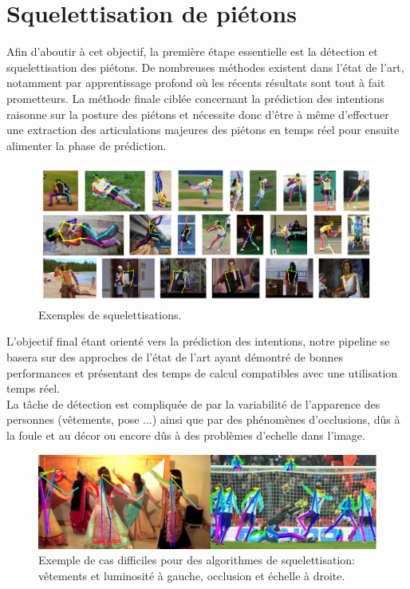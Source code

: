 \section{Squelettisation de piétons}

Afin d’aboutir à cet objectif, la première étape essentielle est la détection et squelettisation des piétons. De nombreuses méthodes existent dans l’état de l’art, notamment par apprentissage profond où les récents résultats sont tout à fait prometteurs. La méthode finale ciblée concernant la prédiction des intentions raisonne sur la posture des piétons et nécessite donc d’être à même d’effectuer une extraction des articulations majeures des piétons en temps réel pour ensuite alimenter la phase de prédiction.


\begin{figure}[H]
    \centering
    \includegraphics[width=0.9\linewidth]{Images/pose_estim_example.png}
    \caption{Exemples de squelettisations.}
    \label{fig:difficulte}
\end{figure}

L’objectif final étant orienté vers la prédiction des intentions, notre pipeline se basera sur des approches de l’état de l’art ayant démontré de bonnes performances et présentant des temps de calcul compatibles avec une utilisation temps réel.\\

La tâche de détection est compliquée de par la variabilité de l’apparence des personnes (vêtements, pose ...)
ainsi que par des phénomènes d’occlusions, dûs à la foule et au décor ou encore dûs à des problèmes d'echelle dans l'image.\\

\begin{figure}[H]
    \centering
    \includegraphics[width=0.85\linewidth]{Images/Difficulties.png}
    \caption{Exemple de cas difficiles pour des algorithmes de squelettisation: vêtements et luminosité à gauche, occlusion et échelle à droite.}
    \label{fig:difficulte}
\end{figure}




